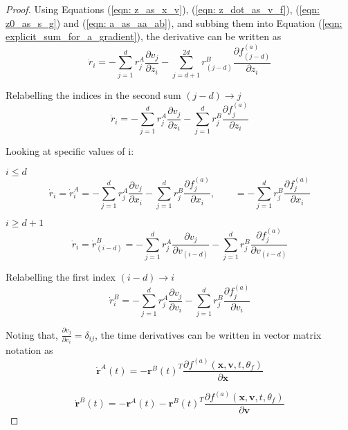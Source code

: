 \documentclass{article}
\theoremstyle{remark}
\theoremstyle{definition}
\begin{document}
\begin{proof}
Using Equations (\ref{eqn: z_as_x_v}), (\ref{eqn: z_dot_as_v_f}), (\ref{eqn: z0_as_s_g}) and (\ref{eqn: a_as_aa_ab}), and subbing them into Equation (\ref{eqn: explicit_sum_for_a_gradient}), the derivative can be written as
\begin{equation}
\dot{r}_{i} = -\sum_{j = 1}^{d}r^{A}_{j}\frac{\partial v_{j}}{\partial z_{i}}
-\sum_{j = d+1}^{2d}r^{B}_{(j-d)}\frac{\partial f^{(a)}_{(j-d)}}{\partial z_{i}}
\end{equation}

Relabelling the indices in the second sum $(j-d) \xrightarrow{}j$
\begin{equation}
\dot{r}_{i} = -\sum_{j = 1}^{d}r^{A}_{j}\frac{\partial v_{j}}{\partial z_{i}}
-\sum_{j = 1}^{d}r^{B}_{j}\frac{\partial f^{(a)}_{j}}{\partial z_{i}}
\end{equation}

Looking at specific values of i:

$i \leq d$
\begin{equation}
\dot{r}_{i} = \dot{r}^{A}_{i} = -\sum_{j = 1}^{d}r^{A}_{j}\frac{\partial v_{j}}{\partial x_{i}}
-\sum_{j = 1}^{d}r^{B}_{j}\frac{\partial f^{(a)}_{j}}{\partial x_{i}}
,\qquad
= -\sum_{j = 1}^{d}r^{B}_{j}\frac{\partial f^{(a)}_{j}}{\partial x_{i}}
\end{equation}

$i \geq d+1$
\begin{equation}
\dot{r}_{i}=
\dot{r}^{B}_{(i-d)} = -\sum_{j = 1}^{d}r^{A}_{j}\frac{\partial v_{j}}{\partial v_{(i-d)}}
-\sum_{j = 1}^{d}r^{B}_{j}\frac{\partial f^{(a)}_{j}}{\partial v_{(i-d)}}
\end{equation}

Relabelling the first index $(i-d) \xrightarrow{} i$
\begin{equation}
\dot{r}^{B}_{i} = -\sum_{j = 1}^{d}r^{A}_{j}\frac{\partial v_{j}}{\partial v_{i}}
-\sum_{j = 1}^{d}r^{B}_{j}\frac{\partial f^{(a)}_{j}}{\partial v_{i}}
\end{equation}

Noting that, 
$\displaystyle  \frac{\partial v_{j}}{\partial v_{i}} = \delta_{ij}$, the time derivatives can be written in vector matrix notation as
\begin{equation}
    \dot{\mathbf{r}}^{A}(t) = -\mathbf{r}^{B}(t)^{T}\frac{\partial f^{(a)}(\mathbf{x}, \mathbf{v}, t, \theta_{f})}{\partial \mathbf{x}}
\end{equation}

\begin{equation}
\label{eqn: ab_dot}
    \dot{\mathbf{r}}^{B}(t) = -\mathbf{r}^{A}(t) -\mathbf{r}^{B}(t)^{T}    \frac{\partial f^{(a)}(\mathbf{x}, \mathbf{v}, t, \theta_{f})}{\partial \mathbf{v}}
\end{equation}


\end{proof}
\end{document}
